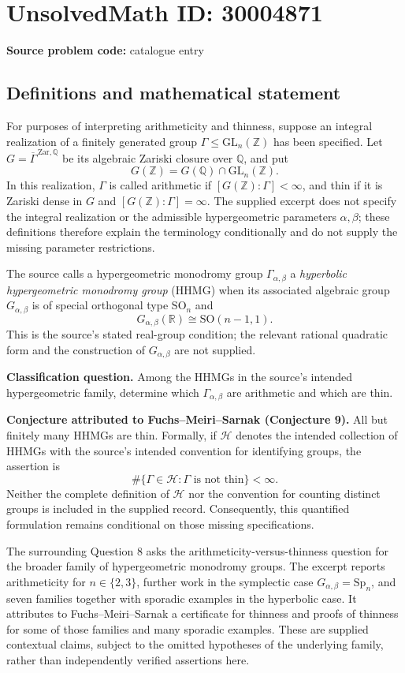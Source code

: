 \documentclass[11pt]{article}
\newcommand{\Z}{\mathbb{Z}}
\newcommand{\Q}{\mathbb{Q}}
\newcommand{\R}{\mathbb{R}}
\begin{document}
\section*{UnsolvedMath ID: 30004871}
\textbf{Source problem code:} catalogue entry
\subsection{Definitions and mathematical statement}
For purposes of interpreting arithmeticity and thinness, suppose an integral realization of a finitely generated group \(\Gamma\leq \mathrm{GL}_n(\Z)\) has been specified. Let \(G=\overline{\Gamma}^{\,\mathrm{Zar},\Q}\) be its algebraic Zariski closure over \(\Q\), and put
\[
G(\Z)=G(\Q)\cap\mathrm{GL}_n(\Z).
\]
In this realization, \(\Gamma\) is called arithmetic if \([G(\Z):\Gamma]<\infty\), and thin if it is Zariski dense in \(G\) and \([G(\Z):\Gamma]=\infty\). The supplied excerpt does not specify the integral realization or the admissible hypergeometric parameters \(\alpha,\beta\); these definitions therefore explain the terminology conditionally and do not supply the missing parameter restrictions.

The source calls a hypergeometric monodromy group \(\Gamma_{\alpha,\beta}\) a \emph{hyperbolic hypergeometric monodromy group} (HHMG) when its associated algebraic group \(G_{\alpha,\beta}\) is of special orthogonal type \(\mathrm{SO}_n\) and
\[
G_{\alpha,\beta}(\R)\cong\mathrm{SO}(n-1,1).
\]
This is the source's stated real-group condition; the relevant rational quadratic form and the construction of \(G_{\alpha,\beta}\) are not supplied.

\textbf{Classification question.} Among the HHMGs in the source's intended hypergeometric family, determine which \(\Gamma_{\alpha,\beta}\) are arithmetic and which are thin.

\textbf{Conjecture attributed to Fuchs--Meiri--Sarnak (Conjecture 9).} All but finitely many HHMGs are thin. Formally, if \(\mathcal H\) denotes the intended collection of HHMGs with the source's intended convention for identifying groups, the assertion is
\[
\#\{\Gamma\in\mathcal H:\Gamma\text{ is not thin}\}<\infty.
\]
Neither the complete definition of \(\mathcal H\) nor the convention for counting distinct groups is included in the supplied record. Consequently, this quantified formulation remains conditional on those missing specifications.

The surrounding Question 8 asks the arithmeticity-versus-thinness question for the broader family of hypergeometric monodromy groups. The excerpt reports arithmeticity for \(n\in\{2,3\}\), further work in the symplectic case \(G_{\alpha,\beta}=\mathrm{Sp}_n\), and seven families together with sporadic examples in the hyperbolic case. It attributes to Fuchs--Meiri--Sarnak a certificate for thinness and proofs of thinness for some of those families and many sporadic examples. These are supplied contextual claims, subject to the omitted hypotheses of the underlying family, rather than independently verified assertions here.
\end{document}
